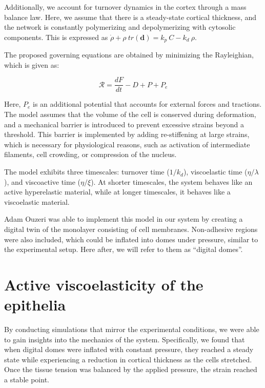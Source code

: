 Additionally, we account for turnover dynamics in the cortex through a
mass balance law. Here, we assume that there is a steady-state cortical
thickness, and the network is constantly polymerizing and depolymerizing
with cytosolic components. This is expressed as
\(\dot{\rho} + \rho \ tr(\mathbf{d}) = k_p\ C - k_d\ \rho\).

The proposed governing equations are obtained by minimizing the
Rayleighian, which is given as:

\[ \mathcal{R} = \frac{dF}{dt} - D + P + P_e \]

Here, \(P_e\) is an additional potential that accounts for external
forces and tractions. The model assumes that the volume of the cell is
conserved during deformation, and a mechanical barrier is introduced to
prevent excessive strains beyond a threshold. This barrier is
implemented by adding re-stiffening at large strains, which is necessary
for physiological reasons, such as activation of intermediate filaments,
cell crowding, or compression of the nucleus.

The model exhibits three timescales: turnover time (\(1/k_d\)),
viscoelastic time (\(\eta/\lambda\)), and viscoactive time
(\(\eta/\xi\)). At shorter timescales, the system behaves like an active
hyperelastic material, while at longer timescales, it behaves like a
viscoelastic material.

Adam Ouzeri was able to implement this model in our system by creating a
digital twin of the monolayer consisting of cell membranes. Non-adhesive
regions were also included, which could be inflated into domes under
pressure, similar to the experimental setup. Here after, we will refer
to them as ``digital domes''.

\hypertarget{active-viscoelasticity-of-the-epithelia}{%
	\section{Active viscoelasticity of the
		epithelia}\label{active-viscoelasticity-of-the-epithelia}}

By conducting simulations that mirror the experimental conditions, we
were able to gain insights into the mechanics of the system.
Specifically, we found that when digital domes were inflated with
constant pressure, they reached a steady state while experiencing a
reduction in cortical thickness as the cells stretched. Once the tissue
tension was balanced by the applied pressure, the strain reached a
stable point.

